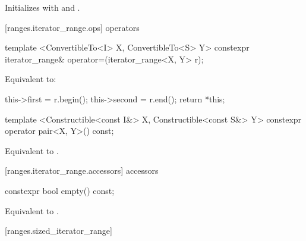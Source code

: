 \begin{itemdescr}
\pnum
\effects Initializes  with
 and .
\end{itemdescr}

[ranges.iterator_range.ops]{ operators}

%
\begin{itemdecl}
template <ConvertibleTo<I> X, ConvertibleTo<S> Y>
  constexpr iterator_range& operator=(iterator_range<X, Y> r);
\end{itemdecl}

\begin{itemdescr}
\pnum
\effects Equivalent to:
\begin{codeblock}
this->first = r.begin();
this->second = r.end();
return *this;
\end{codeblock}
\end{itemdescr}

%
\begin{itemdecl}
template <Constructible<const I&> X, Constructible<const S&> Y>
  constexpr operator pair<X, Y>() const;
\end{itemdecl}

\begin{itemdescr}
\pnum
\returns Equivalent to .
\end{itemdescr}

[ranges.iterator_range.accessors]{ accessors}

%
\begin{itemdecl}
constexpr bool empty() const;
\end{itemdecl}

\begin{itemdescr}
\pnum
\returns Equivalent to .
\end{itemdescr}


[ranges.sized_iterator_range]{}

